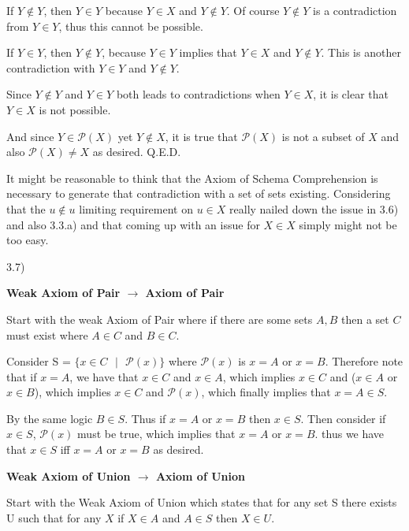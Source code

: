 \documentclass{article}
\begin{document}
If $Y \notin Y$, then $Y \in Y$ because $Y \in X$ and $Y \notin Y$. Of course $Y \notin Y$ is a contradiction from $Y \in Y$, thus this cannot be possible.

\medskip

If $Y \in Y$, then $Y \notin Y$, because $Y \in Y$ implies that $Y \in X$ and $Y \notin Y$. This is another contradiction with $Y \in Y$ and $Y \notin Y$.

\medskip

Since $Y \notin Y$ and $Y \in Y$ both leads to contradictions when $Y \in X$, it is clear that $Y \in X$ is not possible.

\medskip

And since $Y \in \mathcal{P}(X)$ yet $Y \notin X$, it is true that $\mathcal{P}(X)$ is not a subset of $X$ and also $\mathcal{P}(X) \neq X$ as desired. Q.E.D.

\medskip
It might be reasonable to think that the Axiom of Schema Comprehension is necessary to generate that contradiction with a set of sets existing. Considering that the $u \notin u$ limiting requirement on $u \in X$ really nailed down the issue in 3.6) and also 3.3.a) and that coming up with an issue for $X \in X$ simply might not be too easy.

\bigskip

3.7)

\medskip
\textbf{Weak Axiom of Pair $\xrightarrow{}$ Axiom of Pair}
\medskip

Start with the weak Axiom of Pair where if there are some sets $A,B$ then a set $C$ must exist where $A \in C$ and $B \in C$.

\medskip
Consider S = $\{x \in C \text{ } | \text{ } \mathcal{P}(x)\}$ where $\mathcal{P}(x)$ is $x = A$ or $x = B$. Therefore note that if $x = A$, we have that $x \in C$ and $x \in A$, which implies $x \in C$ and ($x \in A$ or $x \in B$), which implies $x \in C$ and $\mathcal{P}(x)$, which finally implies that $x = A \in S$.

\medskip
By the same logic $B \in S$. Thus if $x = A$ or $x = B$ then $x \in S$. Then consider if $x \in S$, $\mathcal{P}(x)$ must be true, which implies that $x = A$ or $x = B$. thus we have that $x \in S$ iff $x = A$ or $x = B$ as desired.

\medskip
\textbf{Weak Axiom of Union $\xrightarrow{}$ Axiom of Union}
\medskip

Start with the Weak Axiom of Union which states that for any set S there exists U such that for any $X$ if $X \in A$ and $A \in S$ then $X \in U$.
\end{document}
